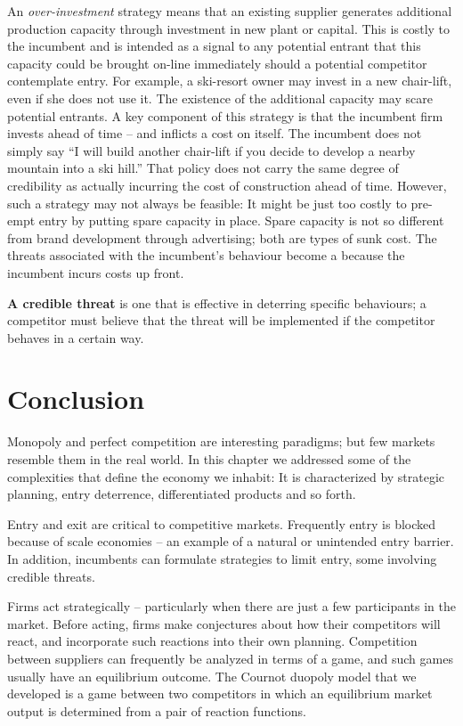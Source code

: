 \newhtmlpage

An \textit{over-investment} strategy means that an existing supplier generates
additional production capacity through investment in new plant or capital.
This is costly to the incumbent and is intended as a signal to any potential
entrant that this capacity could be brought on-line immediately should a potential
competitor contemplate entry. For example, a ski-resort owner may invest in
a new chair-lift, even if she does not use it. The existence of the
additional capacity may scare potential entrants. A key component of this
strategy is that the incumbent firm  invests ahead of time -- and inflicts a
cost on itself. The incumbent does not simply say ``I will
build another chair-lift if you decide to develop a nearby mountain into a
ski hill.'' That policy does not carry the same degree of
credibility as actually incurring the cost of construction ahead of time.
However, such a strategy may not always be feasible: It might be just too costly to
pre-empt entry by putting spare capacity in place. Spare capacity is not
so different from brand development through advertising; both are types of
sunk cost. The threats associated with the incumbent's behaviour become a 
 because the incumbent incurs costs up front.

\begin{DefBox}
\textbf{A credible threat} is one
that is effective in deterring specific behaviours; a competitor must
believe that the threat will be implemented if the competitor behaves in a
certain way.
\end{DefBox}

\section*{Conclusion}

Monopoly and perfect competition are interesting paradigms; but few markets
resemble them in the real world. In this chapter we addressed some of the
complexities that define the economy we inhabit: It is characterized by
strategic planning, entry deterrence, differentiated products and so forth.

Entry and exit are critical to competitive markets. Frequently entry is
blocked because of scale economies -- an example of a natural or unintended
entry barrier. In addition, incumbents can formulate strategies to limit
entry, some involving credible threats.

Firms act strategically -- particularly when there are just a few
participants in the market. Before acting, firms make conjectures about how
their competitors will react, and incorporate such reactions into their own
planning. Competition between suppliers can frequently be analyzed in terms
of a game, and such games usually have an equilibrium outcome. The Cournot
duopoly model that we developed is a game between two competitors in which
an equilibrium market output is determined from a pair of reaction functions.

